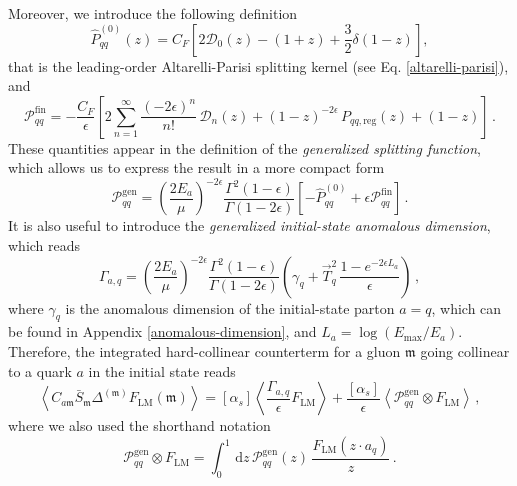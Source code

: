 \documentclass[a4paper, 12pt]{book}
\newcommand{\um}{\mathfrak{m}}
\begin{document}
Moreover, we introduce the following definition
\begin{equation}
  \hat{P}_{qq}^{(0)}(z) = C_F \left[ 2 \mathcal{D}_0 (z)-(1+z)+\frac{3}{2} \delta(1-z) \right],
  \label{kernel-pqq}
\end{equation}
that is the leading-order Altarelli-Parisi splitting kernel (see Eq. \ref{altarelli-parisi}), and
\begin{equation}
  \mathcal{P}_{qq}^{\mathrm{fin}}= - \frac{C_F}{\epsilon} \left[2 \sum_{n=1}^{\infty} \frac{(-2\epsilon)^n}{n!} \, \mathcal{D}_n(z)+(1-z)^{-2\epsilon} \, P_{qq, \mathrm{reg}}(z)+(1-z) \right] \, .
  \label{P-qq-finite}
\end{equation}
These quantities appear in the definition of the \emph{generalized splitting function}, which allows us to express the result in a more compact form
\begin{equation}
  \mathcal{P}_{qq}^{\mathrm{gen}} = \left(\frac{2E_a}{\mu}\right)^{-2\epsilon} \frac{\Gamma^2(1-\epsilon)}{\Gamma(1-2\epsilon)} \left[-\hat{P}^{(0)}_{qq}+\epsilon \mathcal{P}_{qq}^{\mathrm{fin}}\right] \, .
  \label{gen-splitt-funct}
\end{equation}
It is also useful to introduce the \emph{generalized initial-state anomalous dimension}, which reads
\begin{equation}
  \Gamma_{a,q} = \left(\frac{2E_a}{\mu}\right)^{-2\epsilon} \frac{\Gamma^2(1-\epsilon)}{\Gamma(1-2\epsilon)} \left(\gamma_q + \vec{T}_q^2 \,\frac{1-e^{-2\epsilon L_a}}{\epsilon}\right) \, ,
  \label{generalized-anom-dim}
\end{equation}
where $\gamma_q$ is the anomalous dimension of the initial-state parton $a=q$, which can be found in Appendix \ref{anomalous-dimension}, and $L_a =\log{(E_{\mathrm{max}}/E_a)}$. Therefore, the integrated hard-collinear counterterm for a gluon $\um$ going collinear to a quark $a$ in the initial state reads
\begin{equation}
  \left< C_{a\um} \bar{S}_\um \Delta^{(\um)} F_{\mathrm{LM}} (\um) \right> = [\alpha_s] \left< \frac{\Gamma_{a,q}}{\epsilon} F_{\mathrm{LM}} \right> + \frac{[\alpha_s]}{\epsilon}\left< \mathcal{P}_{qq}^{\mathrm{gen}} \otimes F_{\mathrm{LM}} \right> \, ,
  \label{initial-state-collinear}
\end{equation}
where we also used the shorthand notation
\begin{equation}
  \mathcal{P}_{qq}^{\mathrm{gen}} \otimes F_{\mathrm{LM}} = \int_0^1 \, \mathrm{d}z \, \mathcal{P}_{qq}^{\mathrm{gen}}(z) \, \frac{F_{\mathrm{LM}}(z \cdot a_q)}{z} \, .
  \label{convolution}
\end{equation}
\end{document}
